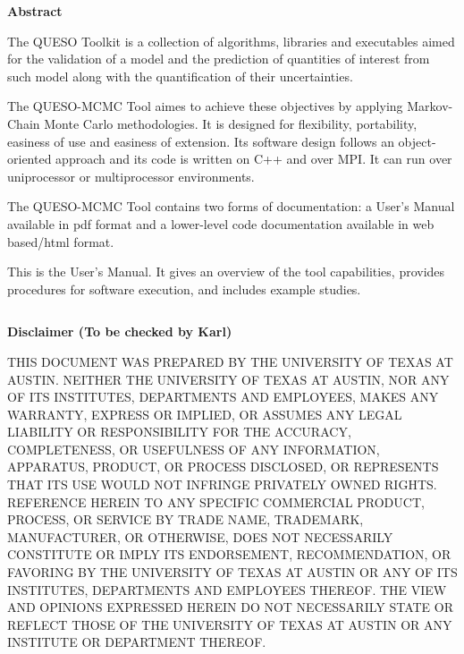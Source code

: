\clearpage
\centerline{\Large\bf Abstract}
$~$\\
The QUESO Toolkit is a
collection of algorithms, libraries and executables aimed for
the validation of a model and
the prediction of quantities of interest from such model
along with the quantification of their uncertainties.

The QUESO-MCMC Tool aimes to achieve these objectives by applying Markov-Chain Monte Carlo methodologies.
It is designed for flexibility, portability, easiness of use and easiness of extension.
Its software design follows an object-oriented approach and
its code is written on C++ and over MPI.
It can run over uniprocessor or multiprocessor environments.

The QUESO-MCMC Tool contains two forms of documentation:
a User's Manual available in pdf format
and
a lower-level code documentation available in web based/html format.

This is the User's Manual.
It gives an overview of the tool capabilities,
provides procedures for software execution, and includes example studies.

\clearpage
$~$\\

\clearpage
\centerline{\Large\bf Disclaimer (To be checked by Karl)}
$~$\\
    THIS DOCUMENT WAS PREPARED
    BY THE UNIVERSITY OF TEXAS AT AUSTIN.
    NEITHER THE UNIVERSITY OF TEXAS
    AT AUSTIN, NOR ANY OF ITS INSTITUTES, DEPARTMENTS AND EMPLOYEES, MAKES ANY WARRANTY, EXPRESS OR IMPLIED,
    OR ASSUMES ANY LEGAL LIABILITY OR RESPONSIBILITY FOR THE ACCURACY, COMPLETENESS, OR
    USEFULNESS OF ANY INFORMATION, APPARATUS, PRODUCT, OR PROCESS DISCLOSED, OR REPRESENTS
    THAT ITS USE WOULD NOT INFRINGE PRIVATELY OWNED RIGHTS. REFERENCE HEREIN TO ANY SPECIFIC
    COMMERCIAL PRODUCT, PROCESS, OR SERVICE BY TRADE NAME, TRADEMARK, MANUFACTURER, OR OTHERWISE,
    DOES NOT NECESSARILY CONSTITUTE OR IMPLY ITS ENDORSEMENT, RECOMMENDATION, OR FAVORING BY
    THE UNIVERSITY OF TEXAS AT AUSTIN OR ANY OF ITS INSTITUTES, DEPARTMENTS AND EMPLOYEES THEREOF.
    THE VIEW AND OPINIONS EXPRESSED HEREIN DO NOT NECESSARILY STATE OR REFLECT
    THOSE OF THE UNIVERSITY OF TEXAS AT AUSTIN OR ANY INSTITUTE OR DEPARTMENT
    THEREOF.

